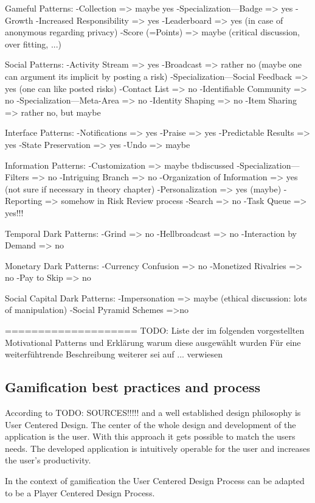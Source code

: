 Gameful Patterns:
-Collection => maybe yes
-Specialization—Badge => yes
-Growth
-Increased Responsibility => yes
-Leaderboard => yes (in case of anonymous regarding privacy)
-Score (=Points) => maybe (critical discussion, over fitting, ...)

Social Patterns:
-Activity Stream => yes
-Broadcast => rather no (maybe one can argument its implicit by posting a risk)
-Specialization—Social Feedback => yes (one can like posted risks)
-Contact List => no
-Identifiable Community => no
-Specialization—Meta-Area => no
-Identity Shaping => no
-Item Sharing => rather no, but maybe

Interface Patterns:
-Notifications => yes
-Praise => yes
-Predictable Results => yes
-State Preservation => yes
-Undo => maybe

Information Patterns:
-Customization => maybe tbdiscussed
-Specialization—Filters => no
-Intriguing Branch => no
-Organization of Information => yes (not sure if necessary in theory chapter)
-Personalization => yes (maybe)
-Reporting => somehow in Risk Review process
-Search => no
-Task Queue => yes!!!

Temporal Dark Patterns:
-Grind => no
-Hellbroadcast => no
-Interaction by Demand => no

Monetary Dark Patterns:
-Currency Confusion => no
-Monetized Rivalries => no
-Pay to Skip => no

Social Capital Dark Patterns:
-Impersonation => maybe (ethical discussion: lots of manipulation)
-Social Pyramid Schemes =>no

====================\newline
TODO: Liste der im folgenden vorgestellten Motivational Patterns und Erklärung warum diese ausgewählt wurden
Für eine weiterfühtrende Beschreibung weiterer sei auf ... verwiesen

\subsection{Gamification best practices and process}
\label{sec:theoryBd}

According to TODO: SOURCES!!!!! and \cite[p. 27, 28]{inproceedings} a well established design philosophy is User Centered Design. The center of the whole design and development of the application is the user. With this approach it gets possible to match the users needs. The developed application is intuitively operable for the user and increases the user's productivity.

In the context of gamification the User Centered Design Process can be adapted to be a Player Centered Design Process.  


